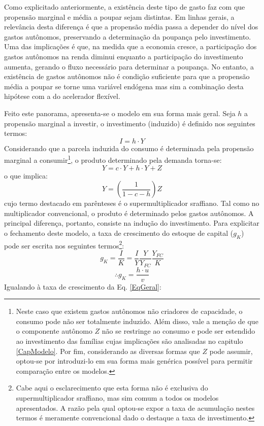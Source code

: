 Como explicitado anteriormente, a existência deste tipo de gasto faz com que propensão marginal e média a poupar sejam distintas. Em linhas gerais, a relevância desta diferença é que a propensão média passa a depender do nível dos gastos autônomos, preservando a determinação da poupança pelo investimento.  Uma das implicações é que, na medida que a economia cresce, a participação dos gastos autônomos na renda diminui enquanto a participação do investimento aumenta, gerando o fluxo necessário para determinar a poupança. 
No entanto, a existência de gastos autônomos não é condição suficiente para que a propensão média a poupar se torne uma variável endógena mas sim a combinação desta hipótese com a do acelerador flexível.

Feito este panorama, apresenta-se o modelo em sua forma mais geral.
Seja $h$ a propensão marginal a investir, o investimento (induzido) é definido nos seguintes termos:
$$
I = h\cdot Y
$$
Considerando que a parcela induzida do consumo é determinada pela propensão marginal a consumir\footnote{Neste caso que existem gastos autônomos não criadores de capacidade, o consumo pode não ser totalmente induzido. Além disso, vale a menção de que o componente autônomo $Z$ não se restringe ao consumo e pode ser estendido ao investimento das famílias cujas implicações são analisadas no capitulo \ref{CapModelo}. Por fim, considerando as diversas formas que $Z$ pode assumir, optou-se por introduzi-lo em sua forma mais genérica possível para permitir comparação entre os modelos.}, o produto determinado pela demanda torna-se:
\begin{equation}
\label{PIBSuper}
    Y = c\cdot Y + h\cdot Y + Z
\end{equation}
o que implica:
\begin{equation}
\label{Supermultiplicador}
Y = \left(\frac{1}{1 - c - h}\right)Z
\end{equation}
cujo termo destacado em parênteses é o supermultiplicador sraffiano. Tal como no multiplicador convencional, o produto é determinado pelos gastos autônomos. A principal diferença, portanto, consiste na indução do investimento. Para explicitar o fechamento deste modelo, a taxa de crescimento do estoque de capital ($g_K$) pode ser escrita nos seguintes termos\footnote{Cabe aqui o esclarecimento que esta forma não é exclusiva do supermultiplicador sraffiano, mas sim comum a todos os modelos apresentados. A razão pela qual optou-se expor a taxa de acumulação nestes termos é meramente convencional dado o destaque a taxa de investimento.}:
$$
g_K = \frac{I}{K} = \frac{I}{Y}\frac{Y}{Y_{FC}}\frac{Y_{FC}}{K}
$$
$$
\therefore g_K = \frac{h\cdot u}{v}
$$
Igualando à taxa de crescimento da Eq. \ref{EqGeral}:


